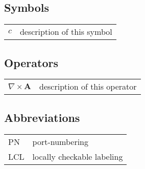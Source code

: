 
\subsection*{Symbols}

\begin{tabular}{ll}
$c$              & description of this symbol\\
\end{tabular}

\subsection*{Operators}

\begin{tabular}{ll}
$\nabla \times \mathbf{A}$              & description of this operator\\
\end{tabular}

\subsection*{Abbreviations}

\begin{tabular}{ll}
PN              & port-numbering\\
LCL             & locally checkable labeling\\
\end{tabular}
